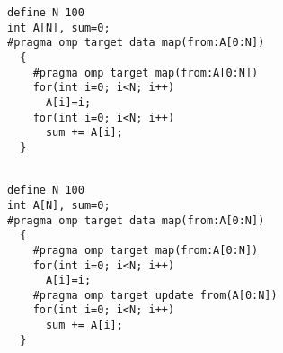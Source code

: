 \begin{minipage}{.4\textwidth}
\begin{lstlisting}[style=customc, frame=tlrb,  caption={Reference Count}, label=incorrectegs2]
define N 100                                                                                            
int A[N], sum=0;
#pragma omp target data map(from:A[0:N]) 
  {
    #pragma omp target map(from:A[0:N])
    for(int i=0; i<N; i++) 
      A[i]=i;
    for(int i=0; i<N; i++) 
      sum += A[i];
  }
\end{lstlisting}
\end{minipage}\hfil
\begin{minipage}{.4\textwidth}
\begin{lstlisting}[style=customc, frame=tlrb, caption={Update Clause}, label=incorrectegs-fix2]

define N 100                                                                                            
int A[N], sum=0;
#pragma omp target data map(from:A[0:N]) 
  {
    #pragma omp target map(from:A[0:N])
    for(int i=0; i<N; i++) 
      A[i]=i;
    #pragma omp target update from(A[0:N])  
    for(int i=0; i<N; i++) 
      sum += A[i];
  }
\end{lstlisting}
\end{minipage}
